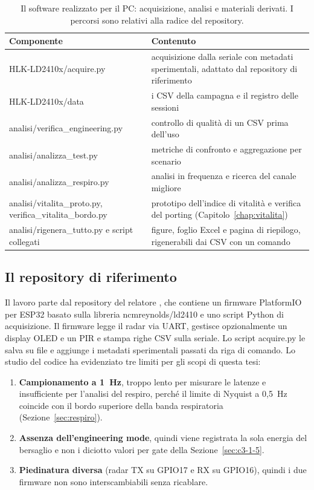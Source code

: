 \begin{table}[!htb]
\centering
\caption{Il software realizzato per il PC: acquisizione, analisi e materiali derivati. I percorsi sono relativi alla radice del repository.}
\label{tab:c3-14b}
\small
\begin{tabularx}{\linewidth}{@{}>{\raggedright\arraybackslash}p{4.3cm}>{\raggedright\arraybackslash}X@{}}
\toprule
\textbf{Componente} & \textbf{Contenuto} \\
\midrule
HLK-LD2410x/acquire.py & acquisizione dalla seriale con metadati sperimentali, adattato dal repository di riferimento \\
HLK-LD2410x/data & i CSV della campagna e il registro delle sessioni \\
analisi/verifica\_\allowbreak{}engineering.py & controllo di qualità di un CSV prima dell'uso \\
analisi/analizza\_\allowbreak{}test.py & metriche di confronto e aggregazione per scenario \\
analisi/analizza\_\allowbreak{}respiro.py & analisi in frequenza e ricerca del canale migliore \\
analisi/vitalita\_\allowbreak{}proto.py,\allowbreak{} verifica\_\allowbreak{}vitalita\_\allowbreak{}bordo.py & prototipo dell'indice di vitalità e verifica del porting (Capitolo~\ref{chap:vitalita}) \\
analisi/rigenera\_\allowbreak{}tutto.py e script collegati & figure, foglio Excel e pagina di riepilogo, rigenerabili dai CSV con un comando \\
\bottomrule
\end{tabularx}
\end{table}

\subsection{Il repository di riferimento}
\label{sec:c3-4-1}

Il lavoro parte dal repository del relatore \cite{repoCallisto}, che contiene un firmware PlatformIO per ESP32 basato sulla libreria ncmreynolds/ld2410 e uno script Python di acquisizione. Il firmware legge il radar via UART, gestisce opzionalmente un display OLED e un PIR e stampa righe CSV sulla seriale. Lo script acquire.py le salva su file e aggiunge i metadati sperimentali passati da riga di comando. Lo studio del codice ha evidenziato tre limiti per gli scopi di questa tesi:

\begin{enumerate}
  \item \textbf{Campionamento a 1~Hz}, troppo lento per misurare le latenze e insufficiente per l'analisi del respiro, perché il limite di Nyquist a 0,5~Hz coincide con il bordo superiore della banda respiratoria (Sezione~\ref{sec:respiro}).
  \item \textbf{Assenza dell'engineering mode}, quindi viene registrata la sola energia del bersaglio e non i diciotto valori per gate della Sezione~\ref{sec:c3-1-5}.
  \item \textbf{Piedinatura diversa} (radar TX su GPIO17 e RX su GPIO16), quindi i due firmware non sono interscambiabili senza ricablare.
\end{enumerate}

